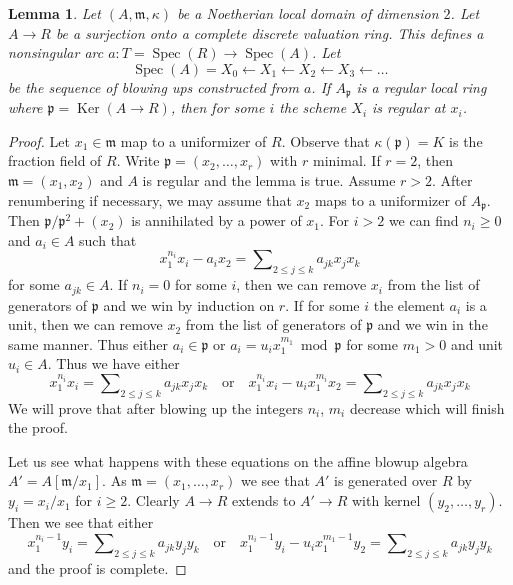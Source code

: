 \documentclass[10pt,a4paper]{amsart}
\theoremstyle{plain}
\newtheorem{lemma}[subsection]{Lemma}
\theoremstyle{definition}
\theoremstyle{remark}
\numberwithin{equation}{subsection}
\def\Spec{\mathop{\mathrm{Spec}}}
\def\Ker{\mathop{\mathrm{Ker}}}
\begin{document}
\begin{lemma}
\label{lemma-sequence-blowups-along-arc-becomes-nonsingular}
Let $(A, \mathfrak m, \kappa)$ be a Noetherian local domain of
dimension $2$. Let $A \to R$ be a surjection onto a
complete discrete valuation ring.
This defines a nonsingular arc $a : T = \Spec(R) \to \Spec(A)$. Let
$$
\Spec(A) = X_0 \leftarrow X_1 \leftarrow X_2 \leftarrow X_3 \leftarrow \ldots
$$
be the sequence of blowing ups constructed from $a$.
If $A_\mathfrak p$ is a regular local ring where
$\mathfrak p = \Ker(A \to R)$, then
for some $i$ the scheme $X_i$ is regular at $x_i$.
\end{lemma}

\begin{proof}
Let $x_1 \in \mathfrak m$ map to a uniformizer of $R$.
Observe that $\kappa(\mathfrak p) = K$ is the
fraction field of $R$. Write $\mathfrak p = (x_2, \ldots, x_r)$
with $r$ minimal. If $r = 2$, then $\mathfrak m = (x_1, x_2)$
and $A$ is regular and the lemma is true. Assume $r > 2$.
After renumbering if necessary,
we may assume that $x_2$ maps to a uniformizer of $A_\mathfrak p$.
Then $\mathfrak p/\mathfrak p^2 + (x_2)$ is annihilated by a power
of $x_1$. For $i > 2$ we can find $n_i \geq 0$ and $a_i \in A$
such that
$$
x_1^{n_i} x_i - a_i x_2 = \sum\nolimits_{2 \leq j \leq k} a_{jk} x_jx_k
$$
for some $a_{jk} \in A$. If $n_i = 0$ for some $i$, then we can remove
$x_i$ from the list of generators of $\mathfrak p$ and we win by
induction on $r$. If for some $i$ the element $a_i$ is a unit, then
we can remove $x_2$ from the list of generators of $\mathfrak p$
and we win in the same manner. Thus either
$a_i \in \mathfrak p$ or $a_i = u_i x_1^{m_1} \bmod \mathfrak p$
for some $m_1 > 0$ and unit $u_i \in A$. Thus we have either
$$
x_1^{n_i} x_i = \sum\nolimits_{2 \leq j \leq k} a_{jk} x_jx_k
\quad\text{or}\quad
x_1^{n_i} x_i - u_i x_1^{m_i} x_2 =
\sum\nolimits_{2 \leq j \leq k} a_{jk} x_jx_k
$$
We will prove that after blowing up the integers $n_i$, $m_i$
decrease which will finish the proof.

\medskip\noindent
Let us see what happens with these equations on the affine blowup
algebra $A' = A[\mathfrak m/x_1]$. As $\mathfrak m = (x_1, \ldots, x_r)$
we see that $A'$ is generated over $R$ by $y_i = x_i/x_1$ for $i \geq 2$.
Clearly $A \to R$ extends to $A' \to R$ with kernel
$(y_2, \ldots, y_r)$. Then we see that either
$$
x_1^{n_i - 1} y_i = \sum\nolimits_{2 \leq j \leq k} a_{jk} y_jy_k
\quad\text{or}\quad
x_1^{n_i - 1} y_i - u_i x_1^{m_1 - 1} y_2 =
\sum\nolimits_{2 \leq j \leq k} a_{jk} y_jy_k
$$
and the proof is complete.
\end{proof}
\end{document}
